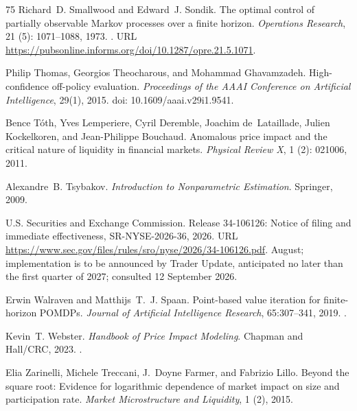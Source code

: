\documentclass[11pt]{article}
\numberwithin{equation}{section}
\theoremstyle{definition}
\theoremstyle{remark}
\theoremstyle{definition}
\begin{document}
\begin{thebibliography}{75}
Richard~D. Smallwood and Edward~J. Sondik.
\newblock The optimal control of partially observable {Markov} processes over a
  finite horizon.
\newblock \emph{Operations Research}, 21 (5): 1071--1088,
  1973.
\newblock {}.
\newblock URL \url{https://pubsonline.informs.org/doi/10.1287/opre.21.5.1071}.

Philip Thomas, Georgios Theocharous, and Mohammad Ghavamzadeh.
\newblock High-confidence off-policy evaluation.
\newblock \emph{Proceedings of the AAAI Conference on Artificial
  Intelligence}, 29(1), 2015.
\newblock doi: 10.1609/aaai.v29i1.9541.

Bence T{\'o}th, Yves Lemperiere, Cyril Deremble, Joachim de~Lataillade, Julien
  Kockelkoren, and Jean-Philippe Bouchaud.
\newblock Anomalous price impact and the critical nature of liquidity in
  financial markets.
\newblock \emph{Physical Review X}, 1 (2): 021006, 2011.

Alexandre~B. Tsybakov.
\newblock \emph{Introduction to Nonparametric Estimation}.
\newblock Springer, 2009.

{U.S. Securities and Exchange Commission}.
\newblock Release 34-106126: Notice of filing and immediate effectiveness,
  {SR-NYSE-2026-36}, 2026.
\newblock URL
  \url{https://www.sec.gov/files/rules/sro/nyse/2026/34-106126.pdf}.
 August; implementation is to be announced by Trader Update,
  anticipated no later than the first quarter of 2027; consulted 12 September
  2026.

Erwin Walraven and Matthijs~T.~J. Spaan.
\newblock Point-based value iteration for finite-horizon {POMDPs}.
\newblock \emph{Journal of Artificial Intelligence Research}, 65:307--341, 2019.
\newblock {}.

Kevin~T. Webster.
\newblock \emph{Handbook of Price Impact Modeling}.
\newblock Chapman and Hall/CRC, 2023.
\newblock {}.

Elia Zarinelli, Michele Treccani, J.~Doyne Farmer, and Fabrizio Lillo.
\newblock Beyond the square root: Evidence for logarithmic dependence of market
  impact on size and participation rate.
\newblock \emph{Market Microstructure and Liquidity}, 1 (2), 2015.

\end{thebibliography}
\end{document}
